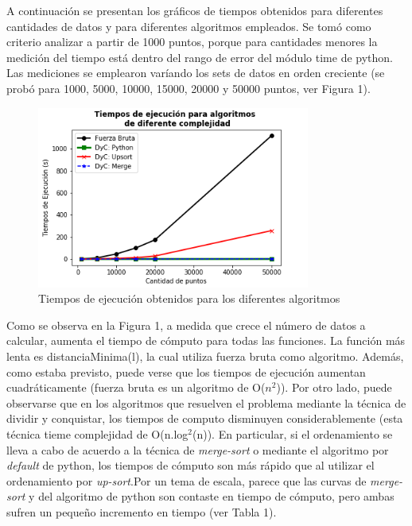 \documentclass[12pt,a4paper,titlepage]{article}
\begin{document}
A continuación se presentan los gráficos de tiempos obtenidos para diferentes cantidades de datos y para diferentes algoritmos empleados. Se tomó como criterio analizar a partir de 1000 puntos, porque para cantidades menores la medición del tiempo está dentro del rango de error del módulo time de python. Las mediciones se emplearon varíando los sets de datos en orden creciente (se probó para 1000, 5000, 10000, 15000, 20000 y 50000 puntos, ver Figura 1). \par 

\begin{figure}[h]
  \centering
    \includegraphics[width=0.8\textwidth]{GraficosEj1}
  \caption{Tiempos de ejecución obtenidos para los diferentes algoritmos}
  \label{fig:ejemplo}
\end{figure}


Como se observa en la Figura 1, a medida que crece el número de datos a calcular, aumenta el tiempo de cómputo para todas las funciones. La función más lenta es distanciaMinima(l), la cual utiliza fuerza bruta como algoritmo. Además, como estaba previsto, puede verse que los tiempos de ejecución aumentan cuadráticamente (fuerza bruta es un algoritmo de O($n^{2}$)). Por otro lado, puede observarse que en los algoritmos que resuelven el problema mediante la técnica de dividir y conquistar, los tiempos de computo disminuyen considerablemente (esta técnica tieme complejidad de O(n.log$^{2}$(n)). En particular, si el ordenamiento se lleva a cabo de acuerdo a la técnica de \textit{merge-sort} o mediante el algoritmo por \textit{default} de python, los tiempos de cómputo son más rápido que al utilizar el ordenamiento por \textit{up-sort}.Por un tema de escala, parece que las curvas de \textit{merge-sort} y del algoritmo de python son contaste en tiempo de cómputo, pero ambas sufren un pequeño incremento en tiempo (ver Tabla 1).
\end{document}
